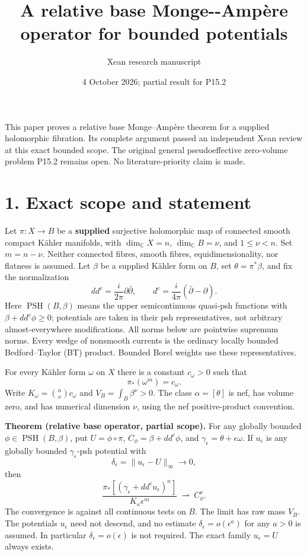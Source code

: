 \documentclass[
  11pt,
]{article}
\title{A relative base Monge-\/-Ampère operator for bounded potentials}
\author{Xean research manuscript}
\date{4 October 2026; partial result for P15.2}
\begin{document}
\maketitle

This paper proves a relative base Monge--Ampère theorem for a supplied holomorphic fibration. Its complete argument passed an independent Xean review at this exact bounded scope. The original general pseudoeffective zero-volume problem P15.2 remains open. No literature-priority claim is made.

\section{1. Exact scope and statement}\label{exact-scope-and-statement}

Let \(\pi:X\to B\) be a \textbf{supplied} surjective holomorphic map of connected smooth compact Kähler manifolds, with \(\dim_{\mathbb{C}}X=n\), \(\dim_{\mathbb{C}}B=\nu\), and \(1\leq\nu<n\). Set \(m=n-\nu\). Neither connected fibres, smooth fibres, equidimensionality, nor flatness is assumed. Let \(\beta\) be a supplied Kähler form on \(B\), set \(\theta=\pi^*\beta\), and fix the normalization \[
dd^c=\frac{i}{2\pi}\partial\bar\partial,\qquad
d^c=\frac{i}{4\pi}(\bar\partial-\partial).
\] Here \(\operatorname{PSH}(B,\beta)\) means the upper semicontinuous quasi-psh functions with \(\beta+dd^c\phi\geq0\); potentials are taken in their psh representatives, not arbitrary almost-everywhere modifications. All norms below are pointwise supremum norms. Every wedge of nonsmooth currents is the ordinary locally bounded Bedford--Taylor (BT) product. Bounded Borel weights use these representatives.

For every Kähler form \(\omega\) on \(X\) there is a constant \(c_\omega>0\) such that \[
\pi_*(\omega^m)=c_\omega.
\] Write \(K_\omega=\binom n\nu c_\omega\) and \(V_B=\int_B\beta^\nu>0\). The class \(\alpha=[\theta]\) is nef, has volume zero, and has numerical dimension \(\nu\), using the nef positive-product convention.

\textbf{Theorem (relative base operator, partial scope).} For any globally bounded \(\phi\in\operatorname{PSH}(B,\beta)\), put \(U=\phi\circ\pi\), \(C_\phi=\beta+dd^c\phi\), and \(\gamma_\epsilon=\theta+\epsilon\omega\). If \(u_\epsilon\) is any globally bounded \(\gamma_\epsilon\)-psh potential with \[
\delta_\epsilon=\|u_\epsilon-U\|_\infty\longrightarrow0,
\] then \[
\frac{\pi_*[(\gamma_\epsilon+dd^c u_\epsilon)^n]}
 {K_\omega\epsilon^m}
\ \rightharpoonup\ C_\phi^\nu.                                      \tag{1}
\] The convergence is against all continuous tests on \(B\). The limit has raw mass \(V_B\). The potentials \(u_\epsilon\) need not descend, and no estimate \(\delta_\epsilon=o(\epsilon^a)\) for any \(a>0\) is assumed. In particular \(\delta_\epsilon=o(\epsilon)\) is not required. The exact family \(u_\epsilon=U\) always exists.
\end{document}

